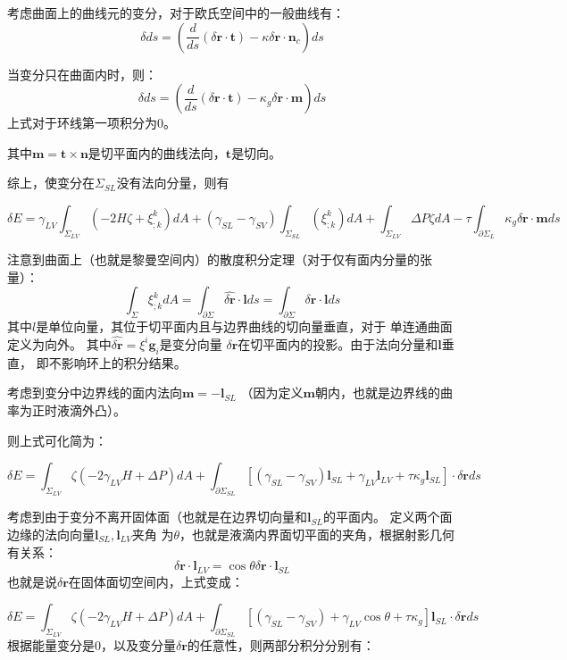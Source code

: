 \documentclass[UTF8,zihao=5]{ctexart}
\begin{document}
考虑曲面上的曲线元的变分，对于欧氏空间中的一般曲线有：
$$
    \delta ds =
    (\frac{d}{ds}(\delta \bm{r} \cdot \bm{t})
    -
    \kappa\delta\bm{r} \cdot  \bm{n}_c)ds
$$

当变分只在曲面内时，则：
$$
    \delta ds =
    (\frac{d}{ds}(\delta \bm{r} \cdot \bm{t})
    -
    \kappa_g\delta\bm{r} \cdot  \bm{m})ds
$$
上式对于环线第一项积分为0。

其中$\bm{m}=\bm{t}\times\bm{n}$是切平面内的曲线法向，$\bm{t}$是切向。

综上，使变分在$\Sigma_{SL}$没有法向分量，则有

$$
    \delta E
    =
    \gamma_{LV}\int_{\Sigma_{LV}}{(-2H\zeta + \xi^k_{;k})dA}
    +
    (\gamma_{SL}-\gamma_{SV})
    \int_{\Sigma_{SL}}{(\xi^k_{;k})dA}
    +
    \int_{\Sigma_{LV}}{\Delta P \zeta dA}
    -
    \tau \int_{\partial\Sigma_{L}}{\kappa_g\delta\bm{r} \cdot \bm{m}ds}
$$

注意到曲面上（也就是黎曼空间内）的散度积分定理（对于仅有面内分量的张量）：
$$
    \int_\Sigma{\xi^k_{;k}dA}=\int_{\partial\Sigma}
    {\hat{\delta\bm{r}}\cdot \bm{l} ds}
    =\int_{\partial\Sigma}
    {\delta\bm{r}\cdot \bm{l} ds}
$$
其中$l$是单位向量，其位于切平面内且与边界曲线的切向量垂直，对于
单连通曲面定义为向外。
其中$\hat{\delta\bm{r}}=\xi^i\bm{g}_i$是变分向量
$\delta\bm{r}$在切平面内的投影。由于法向分量和$\bm{l}$垂直，
即不影响环上的积分结果。

考虑到变分中边界线的面内法向$\bm{m}=-\bm{l}_{SL}$
（因为定义$\bm{m}$朝内，也就是边界线的曲率为正时液滴外凸）。


则上式可化简为：

$$
    \delta E
    =
    \int_{\Sigma_{LV}}{\zeta(-2\gamma_{LV}H + \Delta P) dA}
    +
    \int_{\partial\Sigma_{SL}}{\left[
            (\gamma_{SL}-\gamma_{SV})\bm{l}_{SL}
            +
            \gamma_{LV}\bm{l}_{LV}
            +
            \tau\kappa_g \bm{l}_{SL}
            \right]\cdot \delta\bm{r}
        ds}
$$

考虑到由于变分不离开固体面（也就是在边界切向量和$\bm{l}_{SL}$的平面内。
定义两个面边缘的法向向量$\bm{l}_{SL},\bm{l}_{LV}$夹角
为$\theta$，也就是液滴内界面切平面的夹角，根据射影几何有关系：
$$
    \delta \bm{r}\cdot \bm{l}_{LV} = \cos\theta \delta\bm{r}\cdot\bm{l}_{SL}
$$
也就是说$\delta\bm{r}$在固体面切空间内，上式变成：

$$
    \delta E
    =
    \int_{\Sigma_{LV}}{\zeta(-2\gamma_{LV}H + \Delta P) dA}
    +
    \int_{\partial\Sigma_{SL}}{\left[
            (\gamma_{SL}-\gamma_{SV})
            +
            \gamma_{LV}\cos \theta
            +
            \tau\kappa_g
            \right]\bm{l}_{SL}\cdot \delta\bm{r}
        ds}
$$
根据能量变分是0，以及变分量$\delta \bm{r}$的任意性，则两部分积分分别有：
\end{document}
